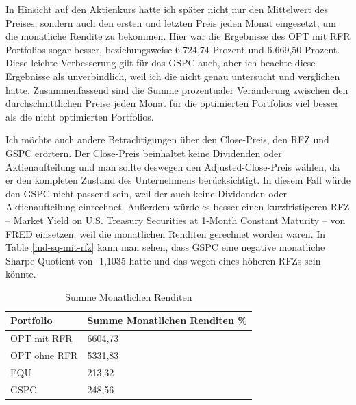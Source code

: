 \documentclass[12pt]{article}
\begin{document}
            In Hinsicht auf den Aktienkurs hatte ich später nicht nur den Mittelwert des Preises, 
            sondern auch den ersten und letzten Preis jeden Monat eingesetzt, um die monatliche Rendite zu bekommen. 
            Hier war die Ergebnisse des OPT mit RFR Portfolios sogar besser, 
            beziehungsweise 6.724,74 Prozent und 6.669,50 Prozent. 
            Diese leichte Verbesserung gilt für das GSPC auch, aber ich beachte diese Ergebnisse als unverbindlich, 
            weil ich die nicht genau untersucht und verglichen hatte. 
            Zusammenfassend sind die Summe prozentualer Veränderung zwischen den durchschnittlichen Preise jeden Monat für 
            die optimierten Portfolios viel besser als die nicht optimierten Portfolios.

            Ich möchte auch andere Betrachtigungen über den Close-Preis, den RFZ und GSPC erörtern. 
            Der Close-Preis beinhaltet keine Dividenden oder Aktienaufteilung 
            und man sollte deswegen den Adjusted-Close-Preis wählen, da
            er den kompleten Zustand des Unternehmens berücksichtigt. In diesem Fall würde den GSPC nicht passend sein, 
            weil der auch keine Dividenden oder Aktienaufteilung einrechnet. 
            Außerdem würde es besser einen kurzfristigeren RFZ -- 
            Market Yield on U.S. Treasury Securities at 1-Month Constant Maturity -- von FRED einsetzen,
            weil die monatlichen Renditen gerechnet worden waren. In Table \ref{md-sq-mit-rfz} kann man sehen,
            dass GSPC eine negative monatliche Sharpe-Quotient von -1,1035 hatte und das wegen eines höheren RFZs sein könnte.
            

            \begin{table}[htp]
                \begin{center}
                    
                    \begin{tabular}{ | l | l | }

                        \hline
                        \textbf{Portfolio}   & \textbf{Summe Monatlichen Renditen \%} \\
                        \hline
                        OPT mit RFR          &      6604,73 \\            
                        OPT ohne RFR         &      5331,83 \\
                        EQU                  &      213,32 \\                 
                        GSPC                 &      248,56 \\          
                             
                        \hline

                    \end{tabular}
                    \caption{Summe Monatlichen Renditen}
                    \label{s-m-renditen-tab}
                \end{center}
            \end{table}
\end{document}
